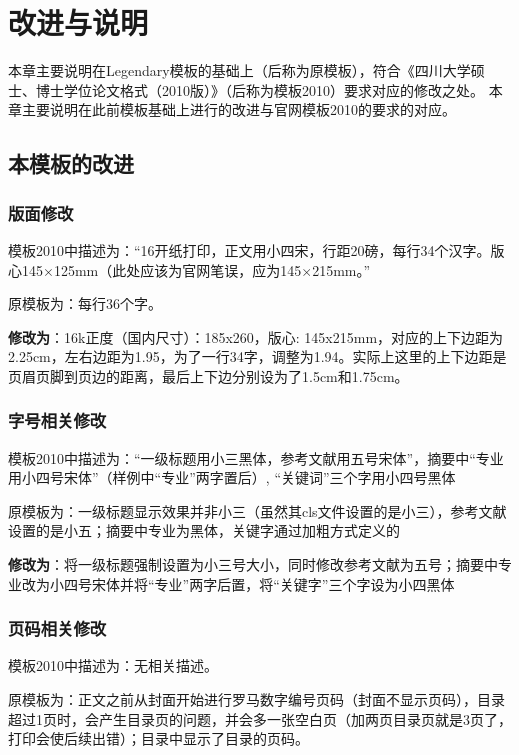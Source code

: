 
\chapter{改进与说明}%
本章主要说明在Legendary模板的基础上（后称为原模板），符合《四川大学硕士、博士学位论文格式（2010版）》\cite{si2010si}（后称为模板2010）要求对应的修改之处。
本章主要说明在此前模板基础上进行的改进与官网模板2010的要求的对应。
\section{本模板的改进}

\subsection{版面修改}
模板2010中描述为：“16开纸打印，正文用小四宋，行距20磅，每行34个汉字。版心145$\times$125mm（此处应该为官网笔误，应为145$\times$215mm。”

原模板为：每行36个字。

\textbf{修改为}：16k正度（国内尺寸）：185x260，版心: 145x215mm，对应的上下边距为2.25cm，左右边距为1.95，为了一行34字，调整为1.94。实际上这里的上下边距是页眉页脚到页边的距离，最后上下边分别设为了{1.5cm}和{1.75cm}。

\subsection{字号相关修改}
模板2010中描述为：“一级标题用小三黑体，参考文献用五号宋体”，摘要中“专业用小四号宋体”（样例中“专业”两字置后）, “关键词”三个字用小四号黑体

原模板为：一级标题显示效果并非小三（虽然其cls文件设置的是小三），参考文献设置的是小五；摘要中专业为黑体，关键字通过加粗方式定义的

\textbf{修改为}：将一级标题强制设置为小三号大小，同时修改参考文献为五号；摘要中专业改为小四号宋体并将“专业”两字后置，将“关键字”三个字设为小四黑体

\subsection{页码相关修改}
模板2010中描述为：无相关描述。

原模板为：正文之前从封面开始进行罗马数字编号页码（封面不显示页码），目录超过1页时，会产生目录页的问题，并会多一张空白页（加两页目录页就是3页了，打印会使后续出错）；目录中显示了目录的页码。

